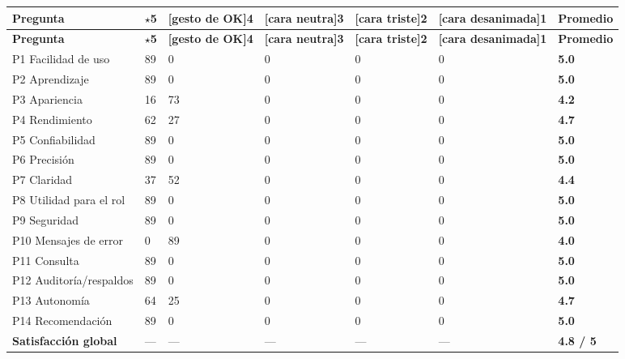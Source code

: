 \documentclass[11pt,a4paper]{article}
\begin{document}
{\small
\begin{longtable}{|p{}|p{}|p{}|p{}|p{}|p{}|p{}|}
\rowcolor{UTECblue}\color{white}\bfseries Pregunta & \color{white}\bfseries {$\star$}5 & \color{white}\bfseries [gesto de OK]4 & \color{white}\bfseries [cara neutra]3 & \color{white}\bfseries [cara triste]2 & \color{white}\bfseries [cara desanimada]1 & \color{white}\bfseries Promedio \\ \hline
\endfirsthead
\rowcolor{UTECblue}\color{white}\bfseries Pregunta & \color{white}\bfseries {$\star$}5 & \color{white}\bfseries [gesto de OK]4 & \color{white}\bfseries [cara neutra]3 & \color{white}\bfseries [cara triste]2 & \color{white}\bfseries [cara desanimada]1 & \color{white}\bfseries Promedio \\ \hline
\endhead
P1 Facilidad de uso & 89 & 0 & 0 & 0 & 0 & \textbf{5.0} \\ \hline
P2 Aprendizaje & 89 & 0 & 0 & 0 & 0 & \textbf{5.0} \\ \hline
P3 Apariencia & 16 & 73 & 0 & 0 & 0 & \textbf{4.2} \\ \hline
P4 Rendimiento & 62 & 27 & 0 & 0 & 0 & \textbf{4.7} \\ \hline
P5 Confiabilidad & 89 & 0 & 0 & 0 & 0 & \textbf{5.0} \\ \hline
P6 Precisión & 89 & 0 & 0 & 0 & 0 & \textbf{5.0} \\ \hline
P7 Claridad & 37 & 52 & 0 & 0 & 0 & \textbf{4.4} \\ \hline
P8 Utilidad para el rol & 89 & 0 & 0 & 0 & 0 & \textbf{5.0} \\ \hline
P9 Seguridad & 89 & 0 & 0 & 0 & 0 & \textbf{5.0} \\ \hline
P10 Mensajes de error & 0 & 89 & 0 & 0 & 0 & \textbf{4.0} \\ \hline
P11 Consulta & 89 & 0 & 0 & 0 & 0 & \textbf{5.0} \\ \hline
P12 Auditoría/respaldos & 89 & 0 & 0 & 0 & 0 & \textbf{5.0} \\ \hline
P13 Autonomía & 64 & 25 & 0 & 0 & 0 & \textbf{4.7} \\ \hline
P14 Recomendación & 89 & 0 & 0 & 0 & 0 & \textbf{5.0} \\ \hline
\textbf{Satisfacción global} & --- & --- & --- & --- & --- & \textbf{4.8 / 5} \\ \hline
\end{longtable}}
\end{document}
